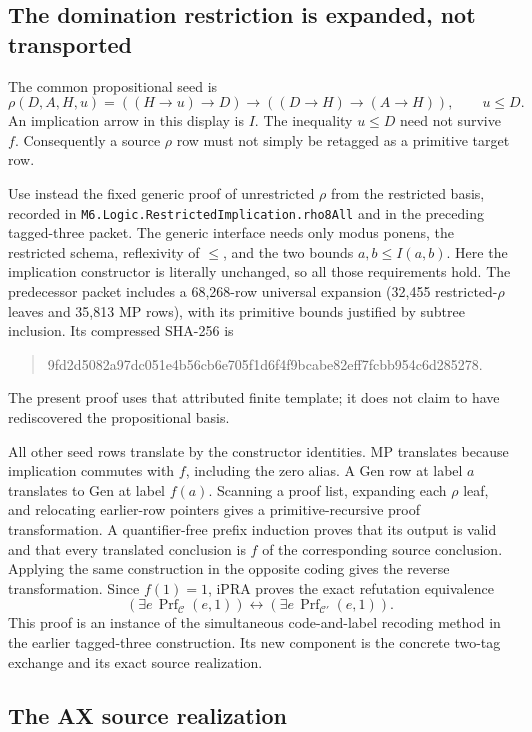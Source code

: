 \subsection{The domination restriction is expanded, not transported}

The common propositional seed is
\[
 \rho(D,A,H,u)=((H\to u)\to D)\to((D\to H)\to(A\to H)),
 \qquad u\le D.
\]
An implication arrow in this display is $I$.  The inequality $u\le D$
need not survive $f$.  Consequently a source $\rho$ row must not simply
be retagged as a primitive target row.

Use instead the fixed generic proof of unrestricted $\rho$ from the
restricted basis, recorded in
\texttt{M6.Logic.RestrictedImplication.rho8All} and in the preceding
tagged-three packet.  The generic interface needs only modus ponens,
the restricted schema, reflexivity of $\le$, and the two bounds
$a,b\le I(a,b)$.  Here the implication constructor is literally unchanged,
so all those requirements hold.  The predecessor packet includes a
68,268-row universal expansion (32,455 restricted-$\rho$ leaves and
35,813 MP rows), with its primitive bounds justified by subtree inclusion.
Its compressed SHA-256 is
\begin{quote}\small\ttfamily
9fd2d5082a97dc051e4b56cb6e705f1d6f4f9bcabe82eff7fcbb954c6d285278.
\end{quote}
The present proof uses that attributed finite template; it does not claim
to have rediscovered the propositional basis.

All other seed rows translate by the constructor identities.  MP translates
because implication commutes with $f$, including the zero alias.  A Gen
row at label $a$ translates to Gen at label $f(a)$.  Scanning a proof list,
expanding each $\rho$ leaf, and relocating earlier-row pointers gives a
primitive-recursive proof transformation.  A quantifier-free prefix
induction proves that its output is valid and that every translated
conclusion is $f$ of the corresponding source conclusion.  Applying the
same construction in the opposite coding gives the reverse transformation.
Since $f(1)=1$, iPRA proves the exact refutation equivalence
\[
 (\exists e\,\operatorname{Prf}_{\mathcal C}(e,1))
 \longleftrightarrow
 (\exists e\,\operatorname{Prf}_{\mathcal C'}(e,1)).
\]
This proof is an instance of the simultaneous code-and-label recoding
method in the earlier tagged-three construction.  Its new component is
the concrete two-tag exchange and its exact source realization.

\subsection{The AX source realization}

